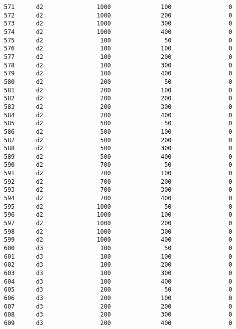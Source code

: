 \documentclass[11pt]{article}
\begin{document}
\begin{Verbatim}[commandchars=\\\{\}]
571      d2               1000              100                0   
572      d2               1000              200                0   
573      d2               1000              300                0   
574      d2               1000              400                0   
575      d2                100               50                0   
576      d2                100              100                0   
577      d2                100              200                0   
578      d2                100              300                0   
579      d2                100              400                0   
580      d2                200               50                0   
581      d2                200              100                0   
582      d2                200              200                0   
583      d2                200              300                0   
584      d2                200              400                0   
585      d2                500               50                0   
586      d2                500              100                0   
587      d2                500              200                0   
588      d2                500              300                0   
589      d2                500              400                0   
590      d2                700               50                0   
591      d2                700              100                0   
592      d2                700              200                0   
593      d2                700              300                0   
594      d2                700              400                0   
595      d2               1000               50                0   
596      d2               1000              100                0   
597      d2               1000              200                0   
598      d2               1000              300                0   
599      d2               1000              400                0   
600      d3                100               50                0   
601      d3                100              100                0   
602      d3                100              200                0   
603      d3                100              300                0   
604      d3                100              400                0   
605      d3                200               50                0   
606      d3                200              100                0   
607      d3                200              200                0   
608      d3                200              300                0   
609      d3                200              400                0   

\end{Verbatim}
\end{document}
